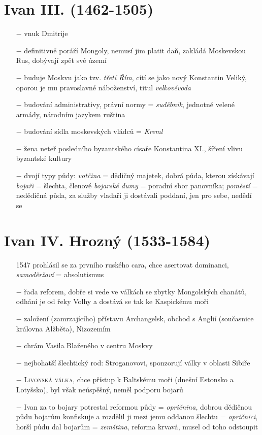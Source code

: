 \documentclass{article}
\begin{document}
\section*{Ivan III. (1462-1505)}
\begin{itemize}
    \vspace{-0.5em}
    \setlength\itemsep{0.15em}
    \item[$-$] vnuk Dmitrije
    \item[$-$] definitivně poráží Mongoly, nemusí jim platit daň, zakládá Moskevskou Rus, dobývají zpět své území
    \item[$-$] buduje Moskvu jako tzv. \textit{třetí Řím}, cítí se jako nový Konstantin Veliký, oporou je mu pravoslavné náboženství, titul \textit{velkovévoda}
    \item[$-$] budování administrativy, právní normy = \textit{suděbnik}, jednotné velené armády, národním jazykem ruština
    \item[$-$] budování sídla moskevských vládců = \textit{Kreml}
    \item[$-$] žena neteř posledního byzantského císaře Konstantina XI., šíření vlivu byzantské kultury
    \item[$-$] dvojí typy půdy: \textit{votčina} = dědičný majetek, dobrá půda, kterou získávají \textit{bojaři} = šlechta, členové \textit{bojarské dumy} = poradní sbor panovníka; \textit{poměstí} = nedědičná půda, za služby vladaři ji dostávali poddaní, jen pro sebe, nedědí se
\end{itemize}

\section*{Ivan IV. Hrozný (1533-1584)}
\begin{itemize}
    \vspace{-0.5em}
    \setlength\itemsep{0.15em}
    \item[1547] prohlásil se za prvního ruského cara, chce asertovat dominanci, \textit{samoděržaví} = absolutismus
    \item[$-$] řada reforem, dobře si vede ve válkách se zbytky Mongolských chanátů, odhání je od řeky Volhy a dostává se tak ke Kaspickému moři
    \item[$-$] založení (zamrzajícího) přístavu Archangelsk, obchod s Anglií (současnice královna Alžběta), Nizozemím
    \item[$-$] chrám Vasila Blaženého v centru Moskvy
    \item[$-$] nejbohatší šlechtický rod: Stroganovovi, sponzorují války v oblasti Sibiře
    \item[$-$] \textsc{Livonská válka}, chce přístup k Baltskému moři (dnešní Estonsko a Lotyšsko), byl však neúspěšný, neměl podporu bojarů
    \item[$-$] Ivan za to bojary potrestal reformou půdy = \textit{opričnina}, dobrou dědičnou půdu bojarům konfiskuje a rozdělil ji mezi jemu oddanou šlechtu = \textit{opričnici}, horší půdu dal bojarům = \textit{zemština}, reforma krvavá, musel od toho odstoupit
\end{itemize}
\end{document}
